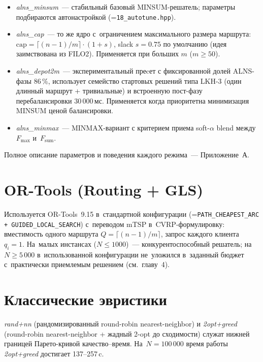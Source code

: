 \documentclass[a4paper,14pt]{extreport}
\makeatletter
\let\old@texttt\texttt
\renewcommand{\texttt}[1]{{\sloppy\hyphenchar\font=\m@ne\old@texttt{#1}}}
\makeatother
\begin{document}
\begin{itemize}
\item \emph{alns\_minsum}~--- стабильный базовый MINSUM-решатель; параметры подбираются автонастройкой (\texttt{18\_autotune.hpp}).
\item \emph{alns\_cap}~--- то же ядро с~ограничением максимального размера маршрута: $\mathrm{cap} = \lceil(n-1)/m\rceil \cdot (1+s)$, slack $s=0.75$ по умолчанию (идея заимствована из FILO2). Применяется при больших $m$ ($m \geq 50$).
\item \emph{alns\_depot2m}~--- экспериментальный преcет с фиксированной долей ALNS-фазы 86\,\%, использует семейство стартовых решений типа LKH-3 (один длинный маршрут + тривиальные) и встроенную пост-фазу перебалансировки 30\,000\,мс. Применяется когда приоритетна минимизация MINSUM ценой балансировки.
\item \emph{alns\_minmax}~--- MINMAX-вариант с критерием приема soft-$\alpha$ blend между $F_{\max}$ и~$F_{\mathrm{sum}}$.
\end{itemize}

Полное описание параметров и поведения каждого режима~--- Приложение~А.

\section{OR-Tools (Routing + GLS)}

Используется OR-Tools~9.15 в~стандартной конфигурации (\texttt{PATH\_CHEAPEST\_ARC + GUIDED\_LOCAL\_SEARCH}) с~переводом mTSP в~CVRP-формулировку: вместимость одного маршрута $Q=\lceil(n-1)/m\rceil$, запрос каждого клиента~$q_i=1$. На~малых инстансах ($N\leq 1000$)~--- конкурентоспособный решатель; на~$N\geq 5\,000$ в~использованной конфигурации не~уложился в~заданный бюджет с~практически приемлемым решением (см.~главу~4).

\section{Классические эвристики}

\emph{rand+nn} (рандомизированный round-robin nearest-neighbor) и \emph{2opt+greed} (round-robin nearest-neighbor + жадный 2-opt до сходимости) служат нижней границей Парето-кривой качество--время. На~$N=100\,000$ время работы \emph{2opt+greed} достигает 137--257\,c.

\end{document}
